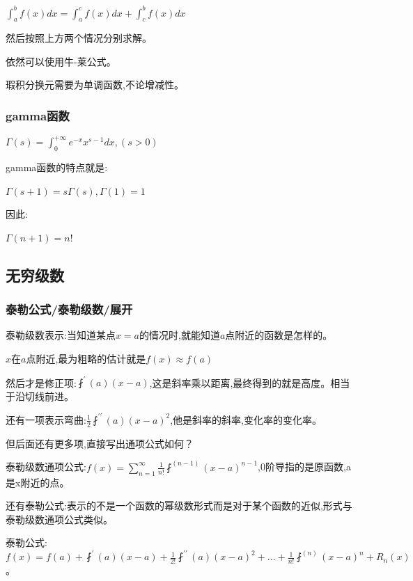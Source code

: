 \documentclass[UTF8]{ctexbook}
\newcommand{\derivative}{^\prime}
\newcommand{\doubleDerivative}{^{\prime\prime}}
\newcommand{\aLotDerivative}[1]{^{(#1)}}
\newcommand{\upDownSum}[2]{\sum\limits_{#2}^{#1}}
\newcommand{\fDerivative}[1]{\fint\derivative(#1)}
\newcommand{\defFunction}[1]{f(#1)}
\newcommand{\definiteIntegral}[2]{\int^{#1}_{#2}}
\begin{document}
{{{{  $\definiteIntegral{b}{a}\defFunction{x}dx = \definiteIntegral{c}{a}\defFunction{x}dx + \definiteIntegral{b}{c}\defFunction{x}dx$

  然后按照上方两个情况分别求解。

  依然可以使用牛-莱公式。

  瑕积分换元需要为单调函数,不论增减性。

}%

\subsubsection{gamma函数}{
$\varGamma(s) = \definiteIntegral{+\infty}{0}e^{-x}x^{s-1}dx, (s > 0)$

gamma函数的特点就是:

$\varGamma(s + 1) = s\varGamma(s), \varGamma(1) = 1$

因此:

$\varGamma(n+1) = n!$

}%

}%

\subsection{无穷级数}{

\subsubsection{泰勒公式/泰勒级数/展开}{
泰勒级数表示:当知道某点$x = a$的情况时,就能知道$a$点附近的函数是怎样的。

$x$在$a$点附近,最为粗略的估计就是$\defFunction{x} \approx \defFunction{a}$

然后才是修正项:$\fDerivative{a}(x - a)$,这是斜率乘以距离,最终得到的就是高度。相当于沿切线前进。

还有一项表示弯曲:$\frac{1}{2}\fint\doubleDerivative(a)(x - a)^2$,他是斜率的斜率,变化率的变化率。

但后面还有更多项,直接写出通项公式如何？

泰勒级数通项公式:$\defFunction{x} = \upDownSum{\infty}{n = 1}\frac{1}{n!}\fint\aLotDerivative{n - 1}(x - a)^{n - 1}$,0阶导指的是原函数,a是x附近的点。

还有泰勒公式:表示的不是一个函数的幂级数形式而是对于某个函数的近似,形式与泰勒级数通项公式类似。

泰勒公式:$\defFunction{x} = \defFunction{a} + \fDerivative{a}(x - a) + \frac{1}{2!}\fint\doubleDerivative(a)(x - a)^2 + ... + \frac{1}{n!}\fint\aLotDerivative{n}(x - a)^n + R_n(x)$。

}}}}
\end{document}
